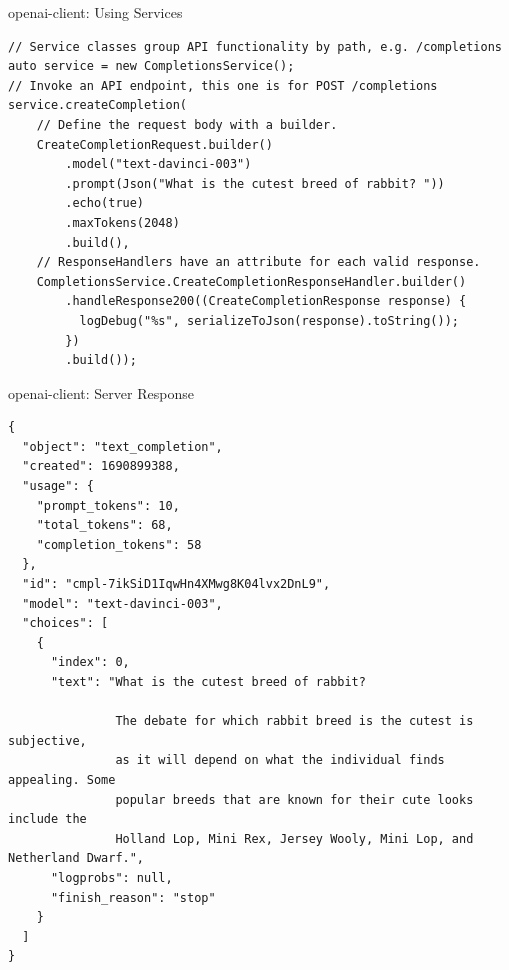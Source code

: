 \documentclass[bigger]{beamer}
\begin{document}
\begin{frame}[label={sec:org7faa1be},fragile,shrink=15]{openai-client: Using Services}
 \begin{verbatim}
// Service classes group API functionality by path, e.g. /completions
auto service = new CompletionsService();
// Invoke an API endpoint, this one is for POST /completions
service.createCompletion(
    // Define the request body with a builder.
    CreateCompletionRequest.builder()
        .model("text-davinci-003")
        .prompt(Json("What is the cutest breed of rabbit? "))
        .echo(true)
        .maxTokens(2048)
        .build(),
    // ResponseHandlers have an attribute for each valid response.
    CompletionsService.CreateCompletionResponseHandler.builder()
        .handleResponse200((CreateCompletionResponse response) {
          logDebug("%s", serializeToJson(response).toString());
        })
        .build());
\end{verbatim}
\end{frame}

\begin{frame}[label={sec:orgff13409},fragile]{openai-client: Server Response}
 \begin{verbatim}
{
  "object": "text_completion",
  "created": 1690899388,
  "usage": {
    "prompt_tokens": 10,
    "total_tokens": 68,
    "completion_tokens": 58
  },
  "id": "cmpl-7ikSiD1IqwHn4XMwg8K04lvx2DnL9",
  "model": "text-davinci-003",
  "choices": [
    {
      "index": 0,
      "text": "What is the cutest breed of rabbit?

               The debate for which rabbit breed is the cutest is subjective,
               as it will depend on what the individual finds appealing. Some
               popular breeds that are known for their cute looks include the
               Holland Lop, Mini Rex, Jersey Wooly, Mini Lop, and Netherland Dwarf.",
      "logprobs": null,
      "finish_reason": "stop"
    }
  ]
}
\end{verbatim}
\end{frame}
\end{document}

